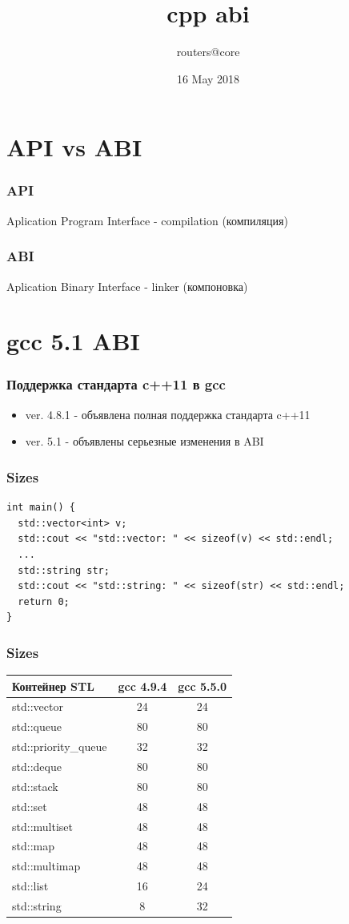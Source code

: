 \documentclass{beamer}
\title[CPP ABI]
    {cpp abi}
\author{routers@core}
\date{16 May 2018}
\begin{document}
\maketitle

\section{API vs ABI}

\begin{frame}[fragile]
\frametitle{API}
Aplication Program Interface - compilation (компиляция)
\end{frame}

\begin{frame}[fragile]
\frametitle{ABI}
Aplication Binary Interface - linker (компоновка)
\end{frame}

\section{gcc 5.1 ABI}

\begin{frame}[fragile]
\frametitle{Поддержка стандарта c++11 в gcc}
\begin{itemize}
\item ver. 4.8.1 - объявлена полная поддержка стандарта c++11
\item ver. 5.1 - объявлены серьезные изменения в ABI
\end{itemize}
\end{frame}

\begin{frame}[fragile]
\frametitle{Sizes}
\begin{verbatim}
int main() {
  std::vector<int> v;
  std::cout << "std::vector: " << sizeof(v) << std::endl;  
  ...
  std::string str;
  std::cout << "std::string: " << sizeof(str) << std::endl;  
  return 0;
}
\end{verbatim}
\end{frame}

\begin{frame}[fragile]
\frametitle{Sizes}
\begin{longtable}{|l|c|c|}
\hline
Контейнер STL & gcc 4.9.4 & gcc 5.5.0 \\
\hline
std::vector & 24 & 24 \\
std::queue & 80 & 80 \\
std::priority\_queue & 32 & 32 \\
std::deque & 80 & 80 \\
std::stack & 80 & 80 \\
std::set & 48 & 48 \\
std::multiset & 48 & 48 \\
std::map & 48 & 48 \\
std::multimap & 48 & 48 \\
std::list & 16 & 24 \\
std::string & 8 & 32 \\
\hline
\end{longtable}
\end{frame}
\end{document}
